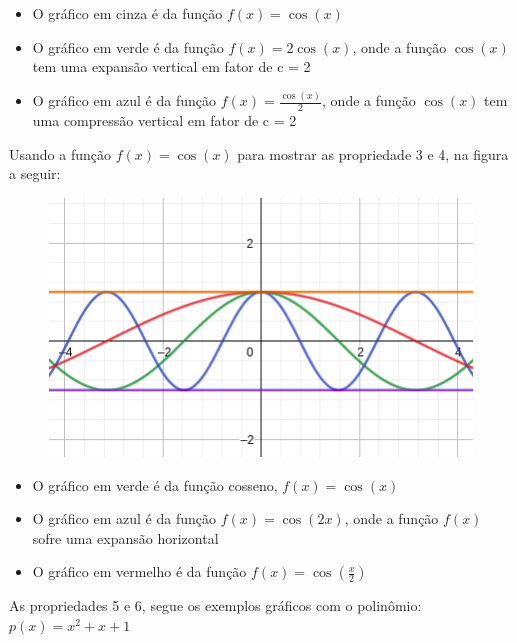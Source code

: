\begin{multicols*}{2}
    \begin{itemize}[wide, labelwidth=!, labelindent=0pt]
        \item O gráfico em cinza é da função $f(x) = \cos(x)$
        \item O gráfico em verde é da função $f(x) = 2 \cos(x)$, onde a função $\cos(x)$ tem uma 						expansão vertical em fator de c = 2
        \item O gráfico em azul é da função $f(x) = \frac{\cos(x)}{2}$, onde a função $\cos(x)$ tem 					uma compressão vertical em fator de c = 2
    \end{itemize}
    Usando a função $f(x) = \cos(x)$ para mostrar as propriedade 3 e 4, na figura a seguir:
    \begin{figure}[H]
        \centering
        \includegraphics[scale=0.4]{assets/rafael/img9.png}
    \end{figure}
    \begin{itemize}[wide, labelwidth=!, labelindent=0pt]
        \item O gráfico em verde é da função cosseno, $f(x) = \cos(x)$
        \item O gráfico em azul é da função $f(x) = \cos(2x)$, onde a função $f(x)$ sofre uma expansão 						horizontal
        \item O gráfico em vermelho é da função $f(x) = \cos \left( \frac{x}{2} \right) $
    \end{itemize}
    As propriedades 5 e 6, segue os exemplos gráficos com o polinômio: $p(x) = x^2 + x +1$
    \begin{figure}[H]
        \centering

\end{figure}
\end{multicols*}
